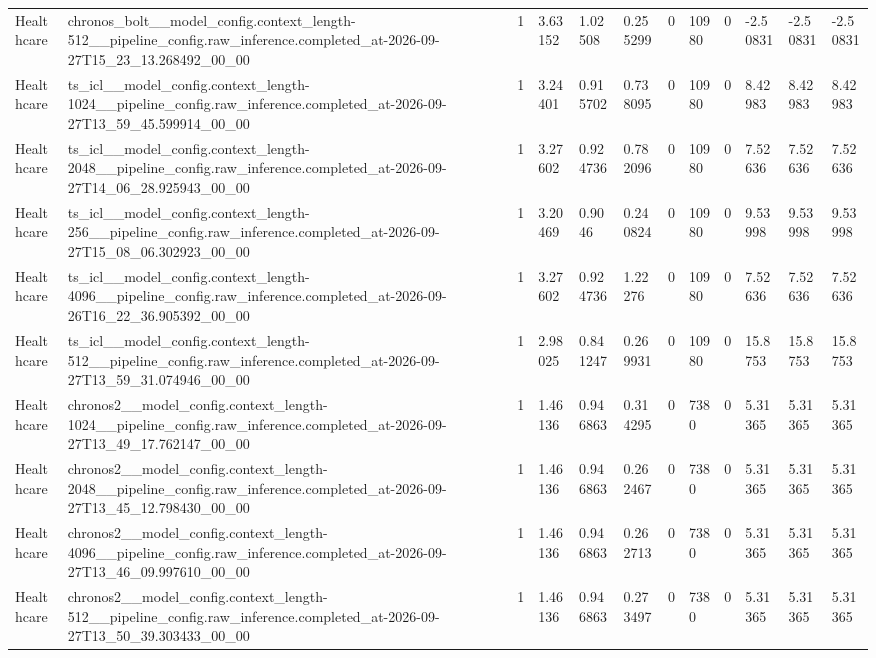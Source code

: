 \begin{tabular}{llllllllllll}
Healthcare & chronos\_bolt\_\_model\_config.context\_length-512\_\_pipeline\_config.raw\_inference.completed\_at-2026-09-27T15\_23\_13.268492\_00\_00 & 1 & 3.63152 & 1.02508 & 0.255299 & 0 & 10980 & 0 & -2.50831 & -2.50831 & -2.50831 \\
Healthcare & ts\_icl\_\_model\_config.context\_length-1024\_\_pipeline\_config.raw\_inference.completed\_at-2026-09-27T13\_59\_45.599914\_00\_00 & 1 & 3.24401 & 0.915702 & 0.738095 & 0 & 10980 & 0 & 8.42983 & 8.42983 & 8.42983 \\
Healthcare & ts\_icl\_\_model\_config.context\_length-2048\_\_pipeline\_config.raw\_inference.completed\_at-2026-09-27T14\_06\_28.925943\_00\_00 & 1 & 3.27602 & 0.924736 & 0.782096 & 0 & 10980 & 0 & 7.52636 & 7.52636 & 7.52636 \\
Healthcare & ts\_icl\_\_model\_config.context\_length-256\_\_pipeline\_config.raw\_inference.completed\_at-2026-09-27T15\_08\_06.302923\_00\_00 & 1 & 3.20469 & 0.9046 & 0.240824 & 0 & 10980 & 0 & 9.53998 & 9.53998 & 9.53998 \\
Healthcare & ts\_icl\_\_model\_config.context\_length-4096\_\_pipeline\_config.raw\_inference.completed\_at-2026-09-26T16\_22\_36.905392\_00\_00 & 1 & 3.27602 & 0.924736 & 1.22276 & 0 & 10980 & 0 & 7.52636 & 7.52636 & 7.52636 \\
Healthcare & ts\_icl\_\_model\_config.context\_length-512\_\_pipeline\_config.raw\_inference.completed\_at-2026-09-27T13\_59\_31.074946\_00\_00 & 1 & 2.98025 & 0.841247 & 0.269931 & 0 & 10980 & 0 & 15.8753 & 15.8753 & 15.8753 \\
Healthcare & chronos2\_\_model\_config.context\_length-1024\_\_pipeline\_config.raw\_inference.completed\_at-2026-09-27T13\_49\_17.762147\_00\_00 & 1 & 1.46136 & 0.946863 & 0.314295 & 0 & 7380 & 0 & 5.31365 & 5.31365 & 5.31365 \\
Healthcare & chronos2\_\_model\_config.context\_length-2048\_\_pipeline\_config.raw\_inference.completed\_at-2026-09-27T13\_45\_12.798430\_00\_00 & 1 & 1.46136 & 0.946863 & 0.262467 & 0 & 7380 & 0 & 5.31365 & 5.31365 & 5.31365 \\
Healthcare & chronos2\_\_model\_config.context\_length-4096\_\_pipeline\_config.raw\_inference.completed\_at-2026-09-27T13\_46\_09.997610\_00\_00 & 1 & 1.46136 & 0.946863 & 0.262713 & 0 & 7380 & 0 & 5.31365 & 5.31365 & 5.31365 \\
Healthcare & chronos2\_\_model\_config.context\_length-512\_\_pipeline\_config.raw\_inference.completed\_at-2026-09-27T13\_50\_39.303433\_00\_00 & 1 & 1.46136 & 0.946863 & 0.273497 & 0 & 7380 & 0 & 5.31365 & 5.31365 & 5.31365 \\

\end{tabular}
